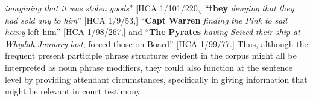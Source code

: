 \textit{imagining} \textit{that} \textit{it} \textit{was} \textit{stolen} \textit{goods}” [HCA 1/101/220,] “\textbf{they} \textit{denying} \textit{that} \textit{they} \textit{had} \textit{sold} \textit{any} \textit{to} \textit{him}” [HCA 1/9/53,] “\textbf{Capt} \textbf{Warren} \textit{finding} \textit{the} \textit{Pink} \textit{to} \textit{sail} \textit{heavy} left him” [HCA 1/98/267,] and “\textbf{The} \textbf{Pyrates} \textit{having} \textit{Seized} \textit{their} \textit{ship} \textit{at} \textit{Whydah} \textit{January} \textit{last}, forced those on Board” [HCA 1/99/77.] Thus, although the frequent present participle phrase structures evident in the corpus might all be interpreted as noun phrase modifiers, they could also function at the sentence level by providing attendant circumstances, specifically in giving information that might be relevant in court testimony. 

